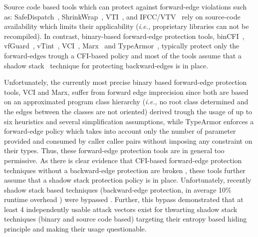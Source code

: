 Source code based tools which can protect against forward-edge violations such as: SafeDispatch~\cite{safedispatch:jang}, ShrinkWrap~\cite{haller:shrinkwrap}, VTI~\cite{bounov:interleaving}, 
and IFCC/VTV~\cite{vtv:tice} rely on source-code availability which limits their applicability (\textit{i.e.,} proprietary libraries can not be recompiled).
In contrast, binary-based forward-edge protection tools, binCFI~\cite{ccfir:zhang, zhang:usenix}, vfGuard~\cite{vfuard:aravind}, 
vTint~\cite{vtint:zhang}, VCI~\cite{vci:asiaccs}, Marx~\cite{marx} and TypeArmor~\cite{veen:typearmor}, typically protect only the forward-edges trough a CFI-based 
policy and most of the tools assume that a shadow stack~\cite{volodymyr:cpi} technique for protecting backward-edges is in place.


Unfortunately, the currently most precise binary based forward-edge protection tools, 
VCI and Marx, suffer from forward edge imprecision since both are based on an approximated program class hierarchy  
(\textit{i.e.,} no root class determined and the edges between the classes are not oriented) derived trough the usage of up to 
six heuristics and several simplification assumptions, while TypeArmor enforces a forward-edge policy which takes into account only the number of parameter 
provided and consumed by caller callee pairs without imposing any constraint on their types. 
Thus, these forward-edge protection tools are in general too permissive.
As there is clear evidence that CFI-based forward-edge protection techniques without a backward-edge protection are broken \cite{carlini:bending}, these tools further assume
that a shadow stack protection policy is in place. Unfortunately, recently shadow stack based techniques (backward-edge protection, in average 10\% runtime overhead \cite{shadowstack:overhead})
were bypassed \cite{safestack:bypass, safestack:bypassing}. Further, this bypass demonstrated that at least 4 independently usable attack vectors exist for thwarting shadow stack techniques 
(binary and source code based) targeting their entropy based hiding principle and making their usage questionable.

